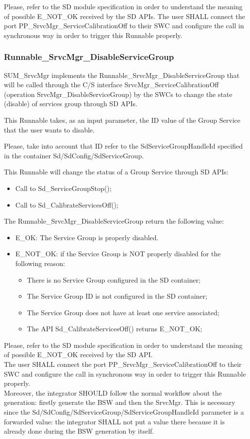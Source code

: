 Please, refer to the SD module specification in order to understand the meaning of possible E\_NOT\_OK received by the SD APIs. 
The user SHALL connect the port PP\_SrvcMgr\_ServiceCalibrationOff to their SWC and configure the call in synchronous way in order to trigger this Runnable properly.

\subsubsection{Runnable\_SrvcMgr\_DisableServiceGroup}
SUM\_SrvcMgr implements the Runnable\_SrvcMgr\_DisableServiceGroup that will be called through the C/S interface SrvcMgr\_ServiceCalibrationOff (operation SrvcMgr\_DisableServiceGroup) 
by the SWCs to change the state (disable) of services group through SD APIs.

This Runnable takes, as an input parameter, the ID value of the Group Service that the user wants to disable. 

Please, take into account that ID refer to the SdServiceGroupHandleId specified in the container Sd/SdConfig/SdServiceGroup.

This Runnable will change the status of a Group Service through SD APIs:

\begin{itemize}
\item Call to Sd\_ServiceGroupStop();
\item Call to Sd\_CalibrateServicesOff();
\end{itemize}

The Runnable\_SrvcMgr\_DisableServiceGroup return the following value: 
\begin{itemize}
\item E\_OK: The Service Group is properly disabled.
\item E\_NOT\_OK: if the Service Group is NOT properly disabled for the following reason:
\begin{itemize}
\item There is no Service Group configured in the SD container; 
\item The Service Group ID is not configured in the SD container; 
\item The Service Group does not have at least one service associated; 
\item The API Sd\_CalibrateServicesOff() returns E\_NOT\_OK;
\end{itemize}
\end{itemize}

Please, refer to the SD module specification in order to understand the meaning of possible E\_NOT\_OK received by the SD API.\\
The user SHALL connect the port PP\_SrvcMgr\_ServiceCalibrationOff to their SWC and configure the call in synchronous way in order to trigger this Runnable properly.\\
Moreover, the integrator SHOULD follow the normal workflow about the generation: firstly generate the BSW and then the SrvcMgr. This is necessary since the Sd/SdConfig/SdServiceGroup/SdServiceGroupHandleId parameter
is a forwarded value: the integrator SHALL not put a value there because it is already done during the BSW generation by itself. 

